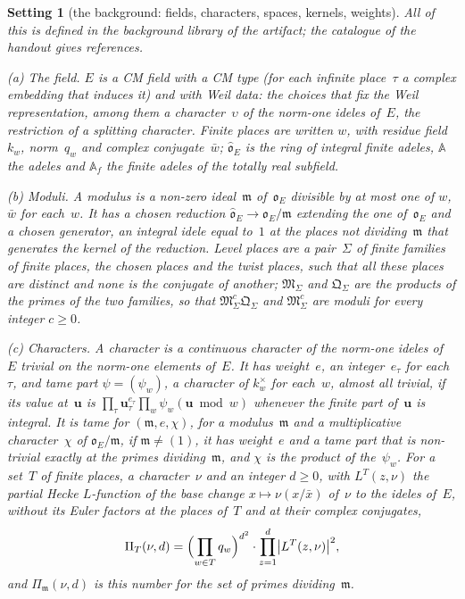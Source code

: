 \documentclass[11pt,a4paper]{article}
\newcommand{\kw}[1]{\emph{#1}}
\newcommand{\m}[1]{\mbox{$#1$}}        %
\theoremstyle{plainx}
\theoremstyle{uprightx}
\newtheorem{setting}[theorem]{Setting}          %
\newcommand{\AAA}{\mathbb{A}}
\newcommand{\OEr}{\mathfrak{o}_E}
\newcommand{\Ohat}{\widehat{\mathfrak{o}}_E}
\newcommand{\LP}[3]{\Pi_{#1}(#2,#3)}
\newcommand{\lpl}{\Sigma}              %
\begin{document}
\begin{setting}[the background: fields, characters, spaces, kernels, weights]\label{set:bg}
All of this is defined in the background library of the artifact; the catalogue of the handout gives references.

\emph{(a) The field.} $E$ is a CM field with a CM type (for each infinite place~$\tau$ a complex embedding that
induces it) and with \kw{Weil data}: the choices that fix the Weil representation, among them a character~$\upsilon$ of
the norm-one ideles of~$E$, the restriction of a splitting character. Finite places are written $w$, with residue
field~$k_w$, norm~$q_w$ and complex conjugate~$\bar w$; $\Ohat$ is the ring of integral finite adeles, $\AAA$ the
adeles and $\AAA_f$ the finite adeles of the totally real subfield.

\emph{(b) Moduli.} A \kw{modulus} is a non-zero ideal~$\mathfrak{m}$ of~$\OEr$ divisible by at most one of $w$,
$\bar w$ for each~$w$. It has a chosen reduction \m{\Ohat\to\OEr/\mathfrak{m}} extending the one of~$\OEr$ and a chosen
\kw{generator}, an integral idele equal to~$1$ at the places not dividing~$\mathfrak{m}$ that generates the kernel of
the reduction. \kw{Level places} are a pair~$\lpl$ of finite families of finite places, the \kw{chosen places} and the
\kw{twist places}, such that all these places are distinct and none is the conjugate of another;
\m{\mathfrak{M}_\lpl} and \m{\mathfrak{Q}_\lpl} are the products of the primes of the two families, so that
\m{\mathfrak{M}_\lpl^{c}\mathfrak{Q}_\lpl} and \m{\mathfrak{M}_\lpl^{c}} are moduli for every integer \m{c\ge0}.

\emph{(c) Characters.} A \kw{character} is a continuous character of the norm-one ideles of~$E$ trivial on the
norm-one elements of~$E$. It has \kw{weight}~$e$, an integer~$e_\tau$ for each~$\tau$, and \kw{tame part}
\m{\psi=(\psi_w)}, a character of \m{k_w^\times} for each~$w$, almost all trivial, if its value at~$\mathbf{u}$ is
\m{\prod_\tau \mathbf{u}_\tau^{e_\tau}\prod_w\psi_w(\mathbf{u}\bmod w)} whenever the finite part of~$\mathbf{u}$ is integral. It is \kw{tame for}
\m{(\mathfrak{m},e,\chi)}, for a modulus~$\mathfrak{m}$ and a multiplicative character~$\chi$ of \m{\OEr/\mathfrak{m}},
if \m{\mathfrak{m}\ne(1)}, it has weight~$e$ and a tame part that is non-trivial exactly at the primes
dividing~$\mathfrak{m}$, and $\chi$ is the product of the~$\psi_w$. For a set~$T$ of finite places, a
character~$\nu$ and an integer \m{d\ge0}, with \m{L^{T}(z,\nu)} the partial Hecke $L$-function of the base change
\m{x\mapsto\nu(x/\bar x)} of~$\nu$ to the ideles of~$E$, without its Euler factors at the places of~$T$ and at their
complex conjugates,
\[\LP{T}{\nu}{d}=\Bigl(\prod_{w\in T}q_w\Bigr)^{d^2}\cdot\prod_{z=1}^{d}\bigl|L^{T}(z,\nu)\bigr|^2,\]
and \m{\LP{\mathfrak{m}}{\nu}{d}} is this number for the set of primes dividing~$\mathfrak{m}$.


\end{setting}
\end{document}
